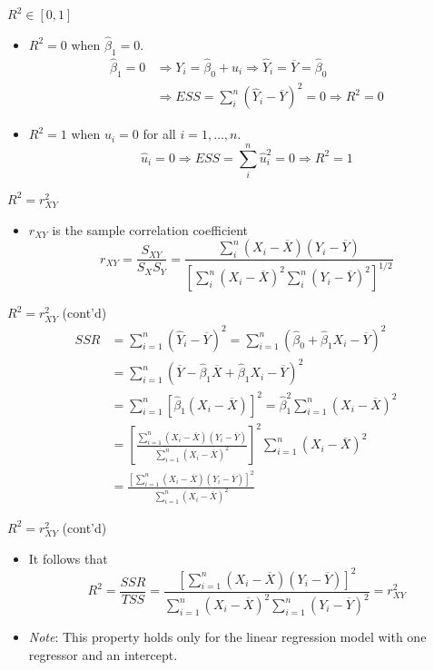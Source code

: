 \documentclass[presentation]{beamer}
\begin{document}
\begin{frame}[label={sec:org05f423e}]{\(R^2 \in [0, 1]\)}
\begin{itemize}
\item \(R^2 = 0\) when \(\hat{\beta}_1 = 0\).
\begin{align*}
\hat{\beta}_1 = 0 &\Rightarrow Y_i = \hat{\beta}_0 + \hat{u}_i
\Rightarrow \hat{Y}_i = \overline{Y} = \hat{\beta}_0 \\ 
&\Rightarrow ESS
= \sum_i^n (\hat{Y}_i - \overline{Y})^2 = 0 \Rightarrow R^2 = 0
\end{align*}
\item \(R^2 = 1\) when \(\hat{u}_i = 0\) for all \(i = 1, \ldots, n\).
\[ \hat{u}_i = 0 \Rightarrow ESS = \sum_i^n \hat{u}_i^2 = 0
  \Rightarrow R^2 = 1 \]
\end{itemize}
\end{frame}

\begin{frame}[label={sec:org51364f4}]{\(R^2 = r^2_{XY}\)}
\begin{itemize}
\item \(r_{XY}\) is the sample correlation coefficient
\[ r_{XY} = \frac{S_{XY}}{S_X S_Y} = \frac{\sum_i^n(X_i -
  \overline{X})(Y_i - \overline{Y})}{\left[\sum_i^n (X_i - \overline{X})^2 \sum_i^n (Y_i -
  \overline{Y})^2 \right]^{1/2}} \]
\end{itemize}
\end{frame}

\begin{frame}[label={sec:orgf40b65d}]{\(R^2 = r^2_{XY}\) (cont'd)}
\begin{align*}
SSR &= \sum_{i=1}^n (\hat{Y}_i - \overline{Y})^2 = \sum_{i=1}^n (\hat{\beta}_0 + \hat{\beta}_1 X_i - \overline{Y})^2 \\
&= \sum_{i=1}^n (\overline{Y} - \hat{\beta}_1 \overline{X} + \hat{\beta}_1 X_i - \overline{Y})^2 \\
&= \sum_{i=1}^n \left[ \hat{\beta}_1 (X_i - \overline{X}) \right]^2 = \hat{\beta}_1^2 \sum_{i=1}^n (X_i - \overline{X})^2 \\
&= \left[\frac{\sum_{i=1}^n (X_i - \overline{X})(Y_i - \overline{Y})}{\sum_{i=1}^n (X_i - \overline{X})^2}\right]^2 \sum_{i=1}^n (X_i - \overline{X})^2 \\
&= \frac{\left[ \sum_{i=1}^n (X_i - \overline{X})(Y_i - \overline{Y}) \right]^2}{\sum_{i=1}^n (X_i - \overline{X})^2}
\end{align*}
\end{frame}

\begin{frame}[label={sec:org2842bb5}]{\(R^2 = r^2_{XY}\) (cont'd)}
\begin{itemize}
\item It follows that
\[
  R^2 = \frac{SSR}{TSS} = \frac{\left[ \sum_{i=1}^n (X_i - \overline{X})(Y_i - \overline{Y}) \right]^2}{\sum_{i=1}^n (X_i - \overline{X})^2 \sum_{i=1}^n (Y_i - \overline{Y})^2} = r^2_{XY}
  \]

\item \emph{Note}: This property holds only for the linear regression model
with \alert{one regressor and an intercept}.
\end{itemize}
\end{frame}
\end{document}
